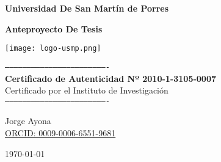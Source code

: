 \documentclass[a4paber,12pt]{article}
\newcommand{\orcid}{\href{https://orcid.org/0009-0006-6551-9681}{ORCID: 0009-0006-6551-9681}}
\begin{document}
	
	\begin{titlepage}
		\centering
		\vspace*{2cm}
		
		{\Huge\bfseries Universidad De San Mart\'in de Porres \par}
		\vspace{1cm}
		
		{\LARGE\bfseries Anteproyecto De Tesis\par}
		\vfill
		
		\texttt{[image: logo-usmp.png]} %
		
		\vspace*{5cm}
		
		\begin{center}
			\texttt{----------------------------------------------------------------------}\\[1ex]
			\textbf{Certificado de Autenticidad Nº 2010-1-3105-0007}\\
			Certificado por el Instituto de Investigación\\[1ex]
			\texttt{----------------------------------------------------------------------}
		\end{center}
		
		\vfill
		
		{\large Jorge Ayona \\ \orcid \\}
		{\large \today\par}
	\end{titlepage}
	
	\tableofcontents
	
	
\end{document}
